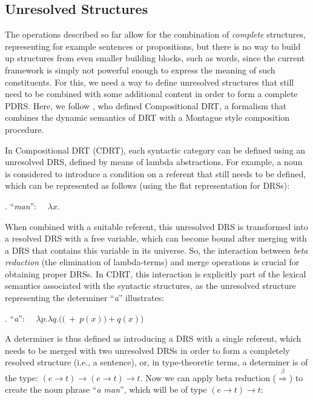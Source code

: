 
\subsection{Unresolved Structures}\label{sec:unresolved}

The operations described so far allow for the combination of \emph{complete}
structures, representing for example sentences or propositions, but there is
no way to build up structures from even smaller building blocks, such as
words, since the current framework is simply not powerful enough to express
the meaning of such constituents. For this, we need a way to define
unresolved structures that still need to be combined with some additional
content in order to form a complete PDRS.  Here, we follow
, who defined Compositional DRT,
a formalism that combines the dynamic semantics of DRT with a Montague style
composition procedure.

In Compositional DRT (CDRT), each syntactic category can be defined using an
unresolved DRS, defined by means of lambda abstractions. For example, a noun
is considered to introduce a condition on a referent that still needs to be
defined, which can be represented as follows (using the flat representation
for DRSs): 

\ex. ``\textit{man}'':~~ $\lambda x.$

When combined with a suitable referent, this unresolved DRS is transformed
into a resolved DRS with a free variable, which can become bound after
merging with a DRS that contains this variable in its universe. So, the
interaction between \textit{beta reduction} (the elimination of lambda-terms)
and merge operations is crucial for obtaining proper DRSs. In CDRT, this
interaction is explicitly part of the lexical semantics associated with the
syntactic structures, as the unresolved structure representing the
determiner ``\textit{a}'' illustrates: 

\ex. ``\textit{a}'':~~ 
  $\lambda p.\lambda q.(($$~+~p(x))+q(x))$

A determiner is thus defined as introducing a DRS with a single referent,
which needs to be merged with two unresolved DRSs in order to form
a completely resolved structure (i.e., a sentence), or, in type-theoretic
terms, a determiner is of the type: $(e\rightarrow t)\rightarrow
(e\rightarrow t) \rightarrow t$. Now we can apply beta reduction
($\stackrel{\beta}{\Rightarrow}$) to create the noun phrase ``\textit{a
man}'', which will be of type $(e\rightarrow t) \rightarrow t$:

